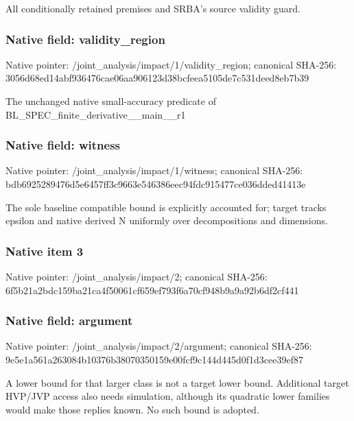 \documentclass[10pt,a4paper]{article}
\begin{document}
\begingroup\raggedright\sloppy All conditionally retained premises and SRBA's source validity guard.\par\endgroup

\subsubsection{Native field: validity\_\allowbreak{}region}
Native pointer: /joint\_\allowbreak{}analysis/impact/1/validity\_\allowbreak{}region; canonical SHA-256: 3056d68ed14abf936476cae06aa906123d38bcfeea5105de7c531deed8eb7b39

\begingroup\raggedright\sloppy The unchanged native small-accuracy predicate of BL\_\allowbreak{}SPEC\_\allowbreak{}finite\_\allowbreak{}derivative\_\allowbreak{}\_\allowbreak{}main\_\allowbreak{}\_\allowbreak{}r1\par\endgroup

\subsubsection{Native field: witness}
Native pointer: /joint\_\allowbreak{}analysis/impact/1/witness; canonical SHA-256: bdb6925289476d5e6457ff3c9663e546386eec94fdc915477ce036dded41413e

\begingroup\raggedright\sloppy The sole baseline compatible bound is explicitly accounted for;\allowbreak{} target tracks epsilon and native derived N uniformly over decompositions and dimensions.\par\endgroup

\subsubsection{Native item 3}
Native pointer: /joint\_\allowbreak{}analysis/impact/2; canonical SHA-256: 6f5b21a2bdc159ba21ca4f50061cf659ef793f6a70cf948b9a9a92b6df2cf441

\subsubsection{Native field: argument}
Native pointer: /joint\_\allowbreak{}analysis/impact/2/argument; canonical SHA-256: 9e5e1a561a263084b10376b38070350159e00fcf9c144d445d0f1d3cee39ef87

\begingroup\raggedright\sloppy A lower bound for that larger class is not a target lower bound. Additional target HVP/\allowbreak{}JVP access also needs simulation,\allowbreak{} although its quadratic lower families would make those replies known. No such bound is adopted.\par\endgroup
\end{document}
